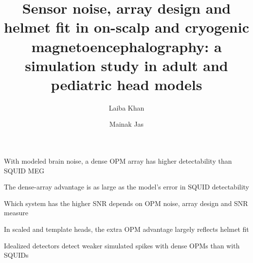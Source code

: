 \documentclass[preprint,12pt,authoryear,a4paper]{elsarticle}
\begin{document}
\begin{frontmatter}

\title{Sensor noise, array design and helmet fit in on-scalp and cryogenic magnetoencephalography: a simulation study in adult and pediatric head models}

\author[a]{Laiba Khan}
\author[b]{Mainak Jas}
\address[a]{Lexington High School, 251 Waltham Street, Lexington, MA 02421, USA}
\address[b]{Athinoula A. Martinos Center for Biomedical Imaging, Massachusetts General Hospital and Harvard Medical School, 149 Thirteenth Street, Charlestown, MA 02129, USA}

\begin{highlights}
\item With modeled brain noise, a dense OPM array has higher detectability than SQUID MEG
\item The dense-array advantage is as large as the model's error in SQUID detectability
\item Which system has the higher SNR depends on OPM noise, array design and SNR measure
\item In scaled and template heads, the extra OPM advantage largely reflects helmet fit
\item Idealized detectors detect weaker simulated spikes with dense OPMs than with SQUIDs
\end{highlights}


\end{frontmatter}
\end{document}
